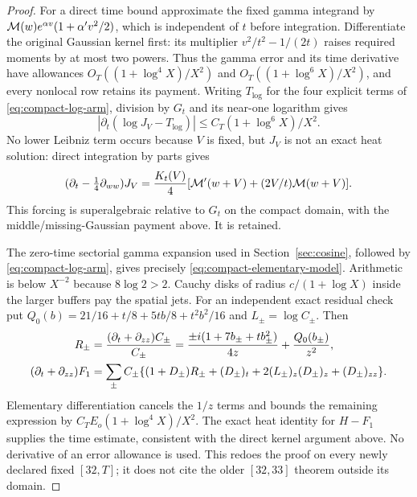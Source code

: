\begin{proof}
For a direct time bound approximate the fixed gamma integrand by
$\mathcal M(w)e^{\alpha v}(1+\alpha'v^2/2)$, which is independent of $t$
before integration. Differentiate the original Gaussian kernel first:
its multiplier $v^2/t^2-1/(2t)$ raises required moments by at most
two powers. Thus the gamma error and its time derivative have
allowances $O_T((1+\log^4X)/X^2)$ and
$O_T((1+\log^6X)/X^2)$, and every nonlocal row retains its payment.
Writing $T_{\log}$ for the four explicit terms of
\eqref{eq:compact-log-arm}, division by $G_t$ and its near-one
logarithm gives
\begin{equation}
 |\partial_t(\log J_V-T_{\log})|
                 \le C_T(1+\log^6X)/X^2.
 \label{eq:compact-log-time}
\end{equation}
No lower Leibniz term occurs because $V$ is fixed, but $J_V$ is
not an exact heat solution: direct integration by parts gives
\begin{equation}
 (\partial_t-\tfrac14\partial_{ww})J_V
  =\frac{K_t(V)}4
          [\mathcal M'(w+V)+(2V/t)\mathcal M(w+V)].
 \label{eq:compact-endpoint-forcing}
\end{equation}
This forcing is superalgebraic relative to $G_t$ on the compact
domain, with the middle/missing-Gaussian payment above. It is retained.

The zero-time sectorial gamma expansion used in
Section~\ref{sec:cosine}, followed by \eqref{eq:compact-log-arm},
gives precisely \eqref{eq:compact-elementary-model}. Arithmetic is
below $X^{-2}$ because $8\log2>2$. Cauchy disks of radius
$c/(1+\log X)$ inside the larger buffers pay the spatial jets.
For an independent exact residual check put
$Q_0(b)=21/16+t/8+5tb/8+t^2b^2/16$ and $L_\pm=\log C_\pm$.
Then
\begin{align}
 R_\pm&=\frac{(\partial_t+\partial_{zz})C_\pm}{C_\pm}
 =\frac{\pm i(1+7b_\pm+tb_\pm^2)}{4z}
                                      +\frac{Q_0(b_\pm)}{z^2},\notag\\
 (\partial_t+\partial_{zz})F_1
 &=\sum_\pm C_\pm\{(1+D_\pm)R_\pm+(D_\pm)_t
           +2(L_\pm)_z(D_\pm)_z+(D_\pm)_{zz}\}.
 \label{eq:compact-elementary-residual}
\end{align}
Elementary differentiation cancels the $1/z$ terms and bounds the
remaining expression by $C_TE_o(1+\log^4X)/X^2$.
The exact heat identity for $H-F_1$ supplies the time estimate,
consistent with the direct kernel argument above. No derivative of
an error allowance is used. This redoes the proof on every newly
declared fixed $[32,T]$; it does not cite the older $[32,33]$ theorem
outside its domain.
\end{proof}

